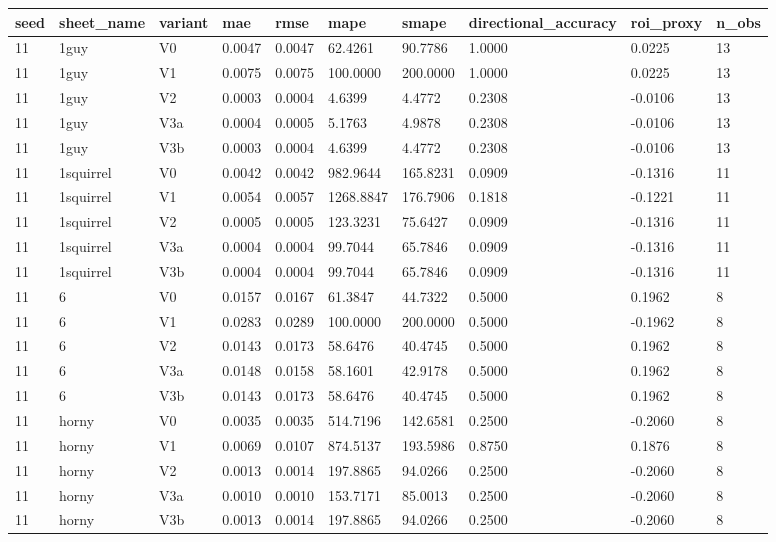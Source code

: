 \begin{table}[htbp]
\centering
\begin{tabular}{llllllllll}
\hline
seed & sheet_name & variant & mae & rmse & mape & smape & directional_accuracy & roi_proxy & n_obs \\
\hline
11 & 1guy & V0 & 0.0047 & 0.0047 & 62.4261 & 90.7786 & 1.0000 & 0.0225 & 13 \\
11 & 1guy & V1 & 0.0075 & 0.0075 & 100.0000 & 200.0000 & 1.0000 & 0.0225 & 13 \\
11 & 1guy & V2 & 0.0003 & 0.0004 & 4.6399 & 4.4772 & 0.2308 & -0.0106 & 13 \\
11 & 1guy & V3a & 0.0004 & 0.0005 & 5.1763 & 4.9878 & 0.2308 & -0.0106 & 13 \\
11 & 1guy & V3b & 0.0003 & 0.0004 & 4.6399 & 4.4772 & 0.2308 & -0.0106 & 13 \\
11 & 1squirrel & V0 & 0.0042 & 0.0042 & 982.9644 & 165.8231 & 0.0909 & -0.1316 & 11 \\
11 & 1squirrel & V1 & 0.0054 & 0.0057 & 1268.8847 & 176.7906 & 0.1818 & -0.1221 & 11 \\
11 & 1squirrel & V2 & 0.0005 & 0.0005 & 123.3231 & 75.6427 & 0.0909 & -0.1316 & 11 \\
11 & 1squirrel & V3a & 0.0004 & 0.0004 & 99.7044 & 65.7846 & 0.0909 & -0.1316 & 11 \\
11 & 1squirrel & V3b & 0.0004 & 0.0004 & 99.7044 & 65.7846 & 0.0909 & -0.1316 & 11 \\
11 & 6 & V0 & 0.0157 & 0.0167 & 61.3847 & 44.7322 & 0.5000 & 0.1962 & 8 \\
11 & 6 & V1 & 0.0283 & 0.0289 & 100.0000 & 200.0000 & 0.5000 & -0.1962 & 8 \\
11 & 6 & V2 & 0.0143 & 0.0173 & 58.6476 & 40.4745 & 0.5000 & 0.1962 & 8 \\
11 & 6 & V3a & 0.0148 & 0.0158 & 58.1601 & 42.9178 & 0.5000 & 0.1962 & 8 \\
11 & 6 & V3b & 0.0143 & 0.0173 & 58.6476 & 40.4745 & 0.5000 & 0.1962 & 8 \\
11 & horny & V0 & 0.0035 & 0.0035 & 514.7196 & 142.6581 & 0.2500 & -0.2060 & 8 \\
11 & horny & V1 & 0.0069 & 0.0107 & 874.5137 & 193.5986 & 0.8750 & 0.1876 & 8 \\
11 & horny & V2 & 0.0013 & 0.0014 & 197.8865 & 94.0266 & 0.2500 & -0.2060 & 8 \\
11 & horny & V3a & 0.0010 & 0.0010 & 153.7171 & 85.0013 & 0.2500 & -0.2060 & 8 \\
11 & horny & V3b & 0.0013 & 0.0014 & 197.8865 & 94.0266 & 0.2500 & -0.2060 & 8 \\

\end{tabular}
\end{table}
